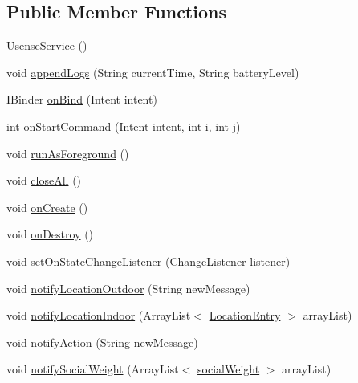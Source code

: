 \subsection*{Public Member Functions}
\begin{DoxyCompactItemize}
\item 
\hyperlink{classcs_1_1usense_1_1_usense_service_ac99c82284e69bfc5dbc5b989fb30997a}{Usense\+Service} ()
\item 
void \hyperlink{classcs_1_1usense_1_1_usense_service_a0a51268c26f69d4741aebf56b80b0ea7}{append\+Logs} (String current\+Time, String battery\+Level)
\item 
I\+Binder \hyperlink{classcs_1_1usense_1_1_usense_service_a6767bb0fe63b15780a2286e5c0a648ce}{on\+Bind} (Intent intent)
\item 
int \hyperlink{classcs_1_1usense_1_1_usense_service_a2692d2a87d04d21efcaccb80e5288145}{on\+Start\+Command} (Intent intent, int i, int j)
\item 
void \hyperlink{classcs_1_1usense_1_1_usense_service_ab777e6a3f067e6b2a6e8f6e94a24c8e9}{run\+As\+Foreground} ()
\item 
void \hyperlink{classcs_1_1usense_1_1_usense_service_af3951f4a9b22086b60c765e190e71019}{close\+All} ()
\item 
void \hyperlink{classcs_1_1usense_1_1_usense_service_a6aaa5b42a8143fc7f768285acd0923c6}{on\+Create} ()
\item 
void \hyperlink{classcs_1_1usense_1_1_usense_service_ad4d6bb0e2e1b794cad28496ed136afd7}{on\+Destroy} ()
\item 
void \hyperlink{classcs_1_1usense_1_1_usense_service_aa679ec7f12a4b3ab5eca53c19b3e0e77}{set\+On\+State\+Change\+Listener} (\hyperlink{interfacecs_1_1usense_1_1_change_listener}{Change\+Listener} listener)
\item 
void \hyperlink{classcs_1_1usense_1_1_usense_service_aea33c3dbd7c41e6fc9666062548fa9a9}{notify\+Location\+Outdoor} (String new\+Message)
\item 
void \hyperlink{classcs_1_1usense_1_1_usense_service_ab0c3e6a74883848bec5c69acde6fdc24}{notify\+Location\+Indoor} (Array\+List$<$ \hyperlink{classcs_1_1usense_1_1location_1_1_location_entry}{Location\+Entry} $>$ array\+List)
\item 
void \hyperlink{classcs_1_1usense_1_1_usense_service_aa12410019072ef4d35fda9aeef5987a8}{notify\+Action} (String new\+Message)
\item 
void \hyperlink{classcs_1_1usense_1_1_usense_service_a70d4675c2cafeeb34c50e42c3e7f1d70}{notify\+Social\+Weight} (Array\+List$<$ \hyperlink{classcs_1_1usense_1_1bluetooth_1_1_bluetooth_core_1_1social_weight}{social\+Weight} $>$ array\+List)

\end{DoxyCompactItemize}
